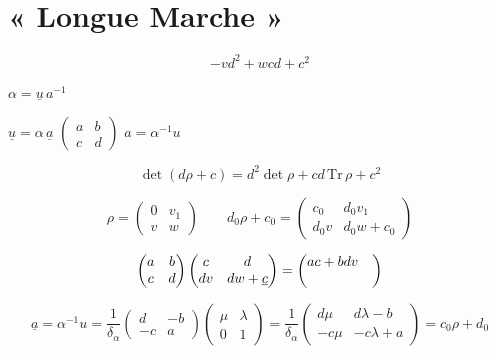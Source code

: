 \documentclass[11pt,a4paper]{article}
\begin{document}
\section{« Longue Marche »}



\[
-v d^2 + w cd + c^2
\]


 $\alpha = \underline{u}\, a^{-1}$

$\underline{u} = \alpha\, \underline{a}$
\qquad
$\begin{pmatrix} a & b \\ c & d \end{pmatrix}$
\qquad
$a = \alpha^{-1} u$

\[
\det(d\rho + c) = d^2 \det\rho + cd\, \mathrm{Tr}\,\rho + c^2
\]


\[
\rho = \begin{pmatrix} 0 & v_1 \\ v & w \end{pmatrix}
\qquad
d_0 \rho + c_0 = \begin{pmatrix} c_0 & d_0 v_1 \\ d_0 v & d_0 w + c_0 \end{pmatrix}
\]

\[
\begin{pmatrix} a & b \\ c & d \end{pmatrix}
\begin{pmatrix} c & d \\ dv & dw + \uncertain{c} \end{pmatrix}
= \begin{pmatrix} ac + bdv & \\ & \end{pmatrix}
\]


\[
\underline{a} = \alpha^{-1} u = \frac{1}{\delta_\alpha}
\begin{pmatrix} d & -b \\ -c & a \end{pmatrix}
\begin{pmatrix} \mu & \lambda \\ 0 & 1 \end{pmatrix}
= \frac{1}{\delta_\alpha}
\begin{pmatrix} d\mu & d\lambda - b \\ -c\mu & -c\lambda + a \end{pmatrix}
= c_0 \rho + d_0
\]
\end{document}
